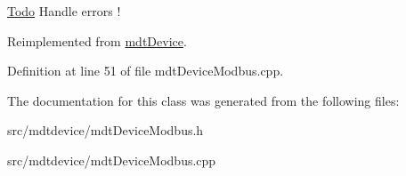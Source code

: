 \begin{Desc}
\item[\hyperlink{todo__todo000002}{Todo}]Handle errors ! \end{Desc}




Reimplemented from \hyperlink{classmdt_device_a96be3ca9235561c58c69190e9ed45ca9}{mdtDevice}.



Definition at line 51 of file mdtDeviceModbus.cpp.



The documentation for this class was generated from the following files:\begin{DoxyCompactItemize}
\item 
src/mdtdevice/mdtDeviceModbus.h\item 
src/mdtdevice/mdtDeviceModbus.cpp\end{DoxyCompactItemize}
